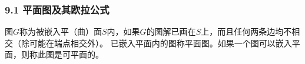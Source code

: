 \documentclass{beamer}
\begin{document}
\begin{CJK}{UTF8}{gbsn}
\begin{frame}
  \frametitle{9.1 平面图及其欧拉公式}
\pause
  \begin{definition9.1.1}
    图$G$称为被嵌入平（曲）面$S$内，如果$G$的图解已画在$S$上，而且任何两条边均不相交（除可能在端点相交外）。
已嵌入平面内的图称\alert{平面图}。如果一个图可以嵌入平面，则称此图是\alert{可平面}的。

\end{definition9.1.1}
\end{frame}


\end{CJK}
\end{document}
